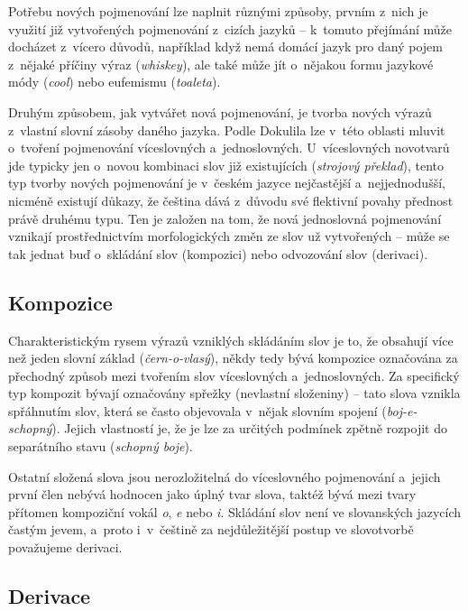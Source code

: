 Potřebu nových pojmenování lze naplnit různými způsoby, prvním z~nich je
využití již vytvořených pojmenování z~cizích jazyků -- k~tomuto
přejímání může docházet z~vícero důvodů, například když nemá domácí
jazyk pro daný pojem z~nějaké příčiny výraz (\emph{whiskey}), ale také
může jít o~nějakou formu jazykové módy (\emph{cool}) nebo eufemismu
(\emph{toaleta}).~\parencite[19]{dokulil62}

Druhým způsobem, jak vytvářet nová pojmenování, je tvorba nových výrazů
z~vlastní slovní zásoby daného jazyka. Podle Dokulila lze v~této oblasti
mluvit o~tvoření pojmenování víceslovných a~jednoslovných.
U~víceslovných novotvarů jde typicky jen o~novou kombinaci slov již
existujících (\emph{strojový překlad}), tento typ tvorby nových
pojmenování je v~českém jazyce nejčastější a~nejjednodušší, nicméně
existují důkazy, že čeština dává z~důvodu své flektivní povahy přednost
právě druhému typu. Ten je založen na tom, že nová jednoslovná
pojmenování vznikají prostřednictvím morfologických změn ze slov už
vytvořených -- může se tak jednat buď o~skládání slov (kompozici) nebo
odvozování slov (derivaci).~\parencite[21]{dokulil62}

\hypertarget{kompozice}{%
\subsection{Kompozice}\label{kompozice}}

Charakteristickým rysem výrazů vzniklých skládáním slov je to, že
obsahují více než jeden slovní základ (\emph{čern-o-vlasý}), někdy tedy
bývá kompozice označována za přechodný způsob mezi tvořením slov
víceslovných a~jednoslovných. Za specifický typ kompozit bývají
označovány spřežky (nevlastní složeniny) -- tato slova vznikla
spřáhnutím slov, která se často objevovala v~nějak slovním spojení
(\emph{boj-e-schopný}). Jejich vlastností je, že je lze za určitých
podmínek zpětně rozpojit do separátního stavu (\emph{schopný boje}).
\parencite[22]{dokulil62}

Ostatní složená slova jsou nerozložitelná do víceslovného pojmenování
a~jejich první člen nebývá hodnocen jako úplný tvar slova, taktéž bývá
mezi tvary přítomen kompoziční vokál \emph{o}, \emph{e} nebo \emph{i}.
Skládání slov není ve slovanských jazycích častým jevem, a~proto
i~v~češtině za nejdůležitější postup ve slovotvorbě považujeme derivaci.
\parencite[22]{dokulil62}

\hypertarget{derivace}{%
\subsection{Derivace}\label{derivace}}

